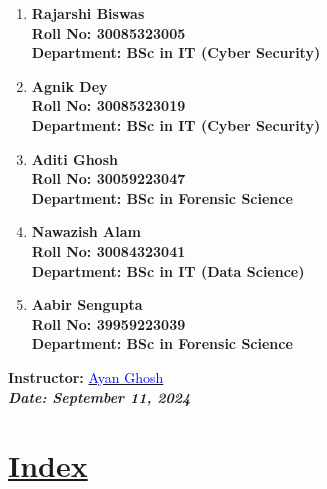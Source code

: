 \documentclass[a4paper,12pt]{article}
\begin{document}
\begin{titlepage}
    \normalsize
    \begin{enumerate}
        \item \textbf{Rajarshi Biswas}\\
              \textbf{Roll No: 30085323005}\\
              \textbf{Department: BSc in IT (Cyber Security)}
        \item \textbf{Agnik Dey}\\
              \textbf{Roll No: 30085323019}\\
              \textbf{Department: BSc in IT (Cyber Security)}
        \item \textbf{Aditi Ghosh}\\
              \textbf{Roll No: 30059223047}\\
              \textbf{Department: BSc in Forensic Science}
        \item \textbf{Nawazish Alam}\\
              \textbf{Roll No: 30084323041}\\
              \textbf{Department: BSc in IT (Data Science)}
              \item \textbf{Aabir Sengupta}\\
              \textbf{Roll No: 39959223039}\\
              \textbf{Department: BSc in Forensic Science}
    \end{enumerate}
    \vspace{0.5 cm}
    
    \textbf{Instructor:} \href{mailto:ayan.ghosh@university.edu}{\textcolor{blue}{Ayan Ghosh}}\\
    \textbf{\textit{Date: September 11, 2024}}

\end{titlepage}
\newpage
{}
\vspace{-2cm}

\centering
\section*{\underline{\Huge\textbf{\textcolor{blue!60}{Index}}}}
\vspace{0.5cm}

\renewcommand{\arraystretch}{2}
\setlength{\tabcolsep}{0pt} 
\end{document}
